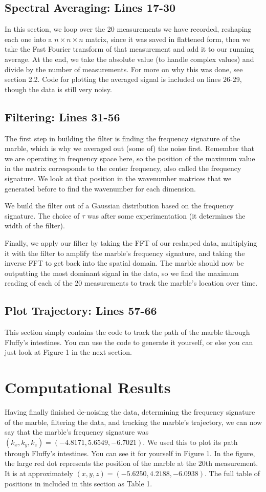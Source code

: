 \documentclass[a4paper,12 pt]{article}
\begin{document}
\subsection{Spectral Averaging: Lines 17-30}
In this section, we loop over the 20 measurements we have recorded, reshaping each one into a $n\times n\times n$ matrix, since it was saved in flattened form, then we take the Fast Fourier transform of that measurement and add it to our running average. At the end, we take the absolute value (to handle complex values) and divide by the number of measurements. For more on why this was done, see section 2.2. Code for plotting the averaged signal is included on lines 26-29, though the data is still very noisy. 

\subsection{Filtering: Lines 31-56}
The first step in building the filter is finding the frequency signature of the marble, which is why we averaged out (some of) the noise first. Remember that we are operating in frequency space here, so the position of the maximum value in the matrix corresponds to the center frequency, also called the frequency signature. We look at that position in the wavenumber matrices that we generated before to find the wavenumber for each dimension.

We build the filter out of a Gaussian distribution based on the frequency signature. The choice of $\tau$ was after some experimentation (it determines the width of the filter).

Finally, we apply our filter by taking the FFT of our reshaped data, multiplying it with the filter to amplify the marble's frequency signature, and taking the inverse FFT to get back into the spatial domain. The marble should now be outputting the most dominant signal in the data, so we find the maximum reading of each of the 20 measurements to track the marble's location over time.

\subsection{Plot Trajectory: Lines 57-66}
This section simply contains the code to track the path of the marble through Fluffy's intestines. You can use the code to generate it yourself, or else you can just look at Figure 1 in the next section.

\section{Computational Results}
Having finally finished de-noising the data, determining the frequency signature of the marble, filtering the data, and tracking the marble's trajectory, we can now say that the marble's frequency signature was $(k_x, k_y, k_z) = (-4.8171, 5.6549, -6.7021)$. We used this to plot its path through Fluffy's intestines. You can see it for yourself in Figure 1. In the figure, the large red dot represents the position of the marble at the 20th measurement. It is at approximately $(x,y,z)=(-5.6250, 4.2188, -6.0938)$. The full table of positions in included in this section as Table 1. 
\end{document}

